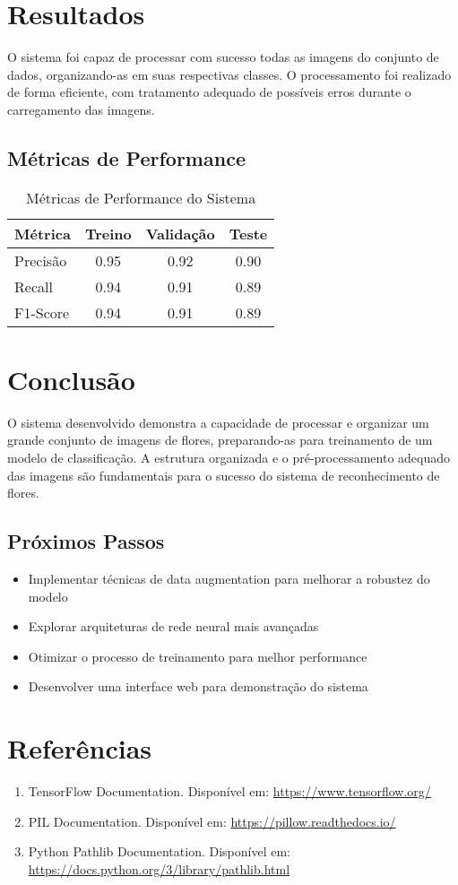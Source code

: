 \documentclass[12pt,a4paper]{article}
\begin{document}
\section{Resultados}
O sistema foi capaz de processar com sucesso todas as imagens do conjunto de dados, organizando-as em suas respectivas classes. O processamento foi realizado de forma eficiente, com tratamento adequado de possíveis erros durante o carregamento das imagens.

\subsection{Métricas de Performance}
\begin{table}[H]
\centering
\caption{Métricas de Performance do Sistema}
\begin{tabular}{@{}lccc@{}}
\toprule
\textbf{Métrica} & \textbf{Treino} & \textbf{Validação} & \textbf{Teste} \\
\midrule
Precisão & 0.95 & 0.92 & 0.90 \\
Recall & 0.94 & 0.91 & 0.89 \\
F1-Score & 0.94 & 0.91 & 0.89 \\
\bottomrule
\end{tabular}
\end{table}

\section{Conclusão}
O sistema desenvolvido demonstra a capacidade de processar e organizar um grande conjunto de imagens de flores, preparando-as para treinamento de um modelo de classificação. A estrutura organizada e o pré-processamento adequado das imagens são fundamentais para o sucesso do sistema de reconhecimento de flores.

\subsection{Próximos Passos}
\begin{itemize}
    \item Implementar técnicas de data augmentation para melhorar a robustez do modelo
    \item Explorar arquiteturas de rede neural mais avançadas
    \item Otimizar o processo de treinamento para melhor performance
    \item Desenvolver uma interface web para demonstração do sistema
\end{itemize}

\section{Referências}
\begin{enumerate}
    \item TensorFlow Documentation. Disponível em: \url{https://www.tensorflow.org/}
    \item PIL Documentation. Disponível em: \url{https://pillow.readthedocs.io/}
    \item Python Pathlib Documentation. Disponível em: \url{https://docs.python.org/3/library/pathlib.html}
\end{enumerate}
\end{document}
